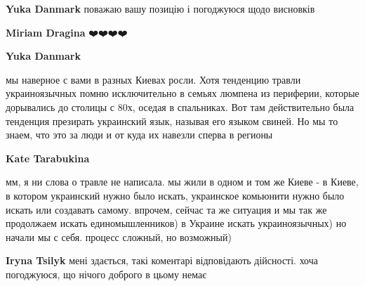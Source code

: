 \begin{itemize}
\begin{itemize}
 
\textbf{Yuka Danmark} поважаю вашу позицію і погоджуюся щодо висновків

 
\textbf{Miriam Dragina} ❤️❤️❤️❤️

 

\textbf{Yuka Danmark} 

мы наверное с вами в разных Киевах росли. Хотя тенденцию травли украиноязычных
помню исключительно в семьях люмпена из периферии, которые дорывались до
столицы с 80х, оседая в спальниках. Вот там действительно была тенденция
презирать украинский язык, называя его языком свиней. Но мы то знаем, что это
за люди и от куда их навезли сперва в регионы


 
\textbf{Kate Tarabukina} 

мм, я ни слова о травле не написала. мы жили в одном и том же Киеве - в Киеве,
в котором украинский нужно было искать, украинское комьюнити нужно было искать
или создавать самому. впрочем, сейчас та же ситуация и мы так же продолжаем
искать единомышленников) в Украине искать украиноязычных) но начали мы с себя.
процесс сложный, но возможный)

 
\textbf{Iryna Tsilyk} мені здається, такі коментарі відповідають дійсності. хоча погоджуюся, що нічого доброго в цьому немає


\end{itemize}
\end{itemize}

